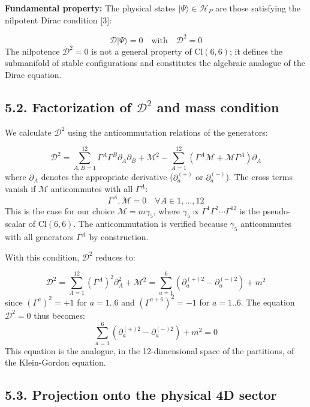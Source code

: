 \documentclass[11pt]{article}
\let\oldmathcal\mathcal
\renewcommand{\mathcal}[1]{\oldmathcal{#1}}
\begin{document}
\textbf{Fundamental property:} The physical states
\(|\Psi\rangle \in \mathcal{H}_P\) are those satisfying the nilpotent
Dirac condition {[}3{]}:

\[
\boxed{\mathcal{D} |\Psi\rangle = 0 \quad \text{with} \quad \mathcal{D}^2 = 0}
\] The nilpotence \(\mathcal{D}^2=0\) is not a general property of
\(\text{Cl}(6,6)\); it defines the submanifold of stable configurations
and constitutes the algebraic analogue of the Dirac equation.

\hypertarget{factorization-of-mathcald2-and-mass-condition}{%
\subsection{\texorpdfstring{5.2. Factorization of \(\mathcal{D}^2\) and
mass
condition}{5.2. Factorization of \textbackslash mathcal\{D\}\^{}2 and mass condition}}\label{factorization-of-mathcald2-and-mass-condition}}

We calculate \(\mathcal{D}^2\) using the anticommutation relations of
the generators:

\[
\mathcal{D}^2 = \sum_{A,B=1}^{12} \Gamma^A \Gamma^B \partial_A \partial_B + \mathcal{M}^2 - \sum_{A=1}^{12} \left( \Gamma^A \mathcal{M} + \mathcal{M} \Gamma^A \right) \partial_A
\] where \(\partial_A\) denotes the appropriate derivative
(\(\partial_a^{(+)}\) or \(\partial_a^{(-)}\)). The cross terms vanish
if \(\mathcal{M}\) anticommutes with all \(\Gamma^A\): \[
{\Gamma^A, \mathcal{M}} = 0 \quad \forall A \in {1,\dots,12}
\] This is the case for our choice \(\mathcal{M} = m \gamma_5\), where
\(\gamma_5 \propto \Gamma^1 \Gamma^2 \cdots \Gamma^{12}\) is the
pseudo-scalar of \(\text{Cl}(6,6)\). The anticommutation is verified
because \(\gamma_5\) anticommutes with all generators \(\Gamma^A\) by
construction.

With this condition, \(\mathcal{D}^2\) reduces to:

\[
\mathcal{D}^2 = \sum_{A=1}^{12} (\Gamma^A)^2 \partial_A^2 + \mathcal{M}^2 = \sum_{a=1}^{6} \left( \partial_a^{(+)2} - \partial_a^{(-)2} \right) + m^2
\] since \((\Gamma^a)^2 = +1\) for \(a=1..6\) and
\((\Gamma^{a+6})^2 = -1\) for \(a=1..6\). The equation
\(\mathcal{D}^2 = 0\) thus becomes: \[
\boxed{ \sum_{a=1}^{6} \left( \partial_a^{(+)2} - \partial_a^{(-)2} \right) + m^2 = 0 }
\] This equation is the analogue, in the 12-dimensional space of the
partitions, of the Klein-Gordon equation.

\hypertarget{projection-onto-the-physical-4d-sector}{%
\subsection{5.3. Projection onto the physical 4D
sector}\label{projection-onto-the-physical-4d-sector}}
\end{document}
